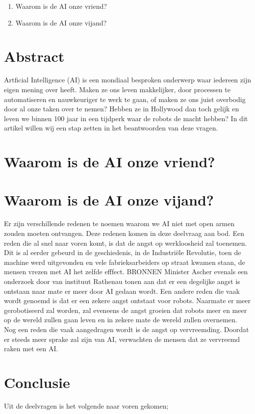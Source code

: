 \documentclass{article}
\begin{document}
\begin{enumerate}
	\item Waarom is de AI onze vriend?
	\item Waarom is de AI onze vijand?
\end{enumerate}  

\newpage
\section{Abstract}
	Artficial Intelligence (AI) is een mondiaal besproken onderwerp waar iedereen zijn eigen mening over heeft. 
	Maken ze ons leven makkelijker, door processen te automatiseren en nauwkeuriger te werk te gaan, of
	maken ze ons juist overbodig door al onze taken over te nemen? Hebben ze in Hollywood dan toch gelijk
	en leven we binnen 100 jaar in een tijdperk waar de robots de macht hebben? In dit artikel willen wij
	een stap zetten in het beantwoorden van deze vragen.

\newpage
\section{Waarom is de AI onze vriend?}

\newpage
\section{Waarom is de AI onze vijand?}
Er zijn verschillende redenen te noemen waarom we AI niet met open armen zouden moeten ontvangen. Deze redenen komen in deze deelvraag aan bod.
Een reden die al snel naar voren komt, is dat de angst op werkloosheid zal toenemen. Dit is al eerder gebeurd in de geschiedenis, in de Industriële Revolutie, toen de machine werd uitgevonden en vele fabrieksarbeiders op straat kwamen staan, de mensen vrezen met AI het zelfde efffect. BRONNEN Minister Ascher evenals een onderzoek door van instituut Rathenau tonen aan dat er een degelijke angst is ontstaan naar mate er meer door AI gedaan wordt. 
Een andere reden die vaak wordt genoemd is dat er een zekere angst ontstaat voor robots. Naarmate er meer gerobotiseerd zal worden, zal eveneens de angst groeien dat robots meer en meer op de wereld zullen gaan leven en in zekere mate de wereld zullen overnemen. 
Nog een reden die vaak aangedragen wordt is de angst op vervreemding. Doordat er steeds meer sprake zal zijn van AI, verwachten de mensen dat ze vervreemd raken met een AI. 

\newpage
\section{Conclusie}
Uit de deelvragen is het volgende naar voren gekomen; 

\newpage
\nocite{robotsamenleving,vriendofvijand,arbeidsmarkt,breinoverbodig,stephenhawking,killemachine,uitgeroeid,autonomous,benificialai,pastandfuture}


% 
% 
\end{document}
